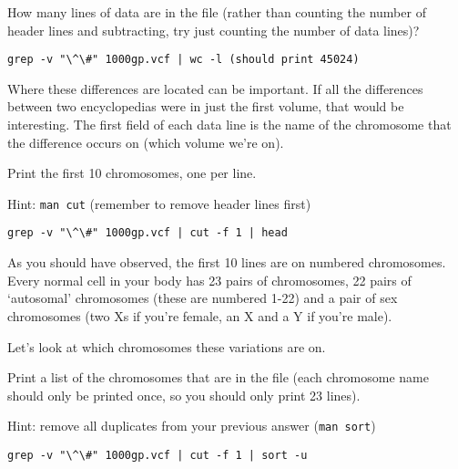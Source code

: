 \begin{questions}
How many lines of data are in the file (rather than counting the number of header lines and subtracting, try just counting the number of data lines)? \\
\begin{answer}
\begin{lstlisting}
grep -v "\^\#" 1000gp.vcf | wc -l (should print 45024)
\end{lstlisting}
\end{answer}
\end{questions}

\begin{note}
Where these differences are located can be important. If all the differences between two encyclopedias were in just the first volume, that would be interesting. The first field of each data line is the name of the chromosome that the difference occurs on (which volume we're on). 
\end{note}

\begin{questions}
Print the first 10 chromosomes, one per line. 

Hint: \texttt{man cut} (remember to remove header lines first)
\begin{answer}
\begin{lstlisting}
grep -v "\^\#" 1000gp.vcf | cut -f 1 | head
\end{lstlisting}
\end{answer}
\end{questions}

\begin{note}
As you should have observed, the first 10 lines are on numbered chromosomes. Every normal cell in your body has 23 pairs of chromosomes, 22 pairs of `autosomal' chromosomes (these are numbered 1-22) and a pair of sex chromosomes (two Xs if you're female, an X and a Y if you're male).

Let's look at which chromosomes these variations are on. 

\end{note}
\begin{questions}
Print a list of the chromosomes that are in the file (each chromosome name should only be printed once, so you should only print 23 lines).

Hint: remove all duplicates from your previous answer (\texttt{man sort})
\begin{answer}
\begin{lstlisting}
grep -v "\^\#" 1000gp.vcf | cut -f 1 | sort -u
\end{lstlisting}
\end{answer}
\end{questions}

